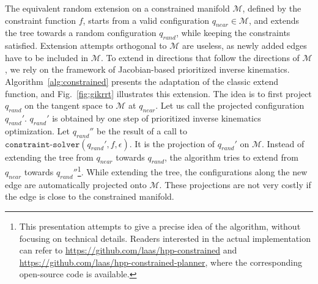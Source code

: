 \documentclass{article}
\newcommand\manifold{\mathcal{M}}
\begin{document}
The equivalent random  extension on a constrained manifold $\manifold$, 
defined by the constraint function $f$,
starts from a valid configuration $q_{near} \in \manifold$, and extends the tree
towards a random configuration $q_{rand}$, while keeping the constraints
satisfied. Extension attempts orthogonal to $\manifold$ are useless,
as newly added edges have to be included  in $\manifold$. To extend in directions
that follow the directions of $\manifold$, we rely on the framework of 
Jacobian-based prioritized inverse kinematics. Algorithm~\ref{alg:constrained} presents
the adaptation of the classic extend function, and Fig.~\ref{fig:gikrrt} illustrates this
extension. The idea is to first project $q_{rand}$ on the tangent
space to $\manifold$  at $q_{near}$. Let us call the projected configuration $q_{rand}'$.
$q_{rand}'$ is obtained by one step of prioritized inverse kinematics optimization. Let 
$q_{rand}''$  be the result of a call to $\texttt{constraint-solver}(q_{rand}',f,\epsilon)$.  It is 
the projection
of $q_{rand}'$ on $\manifold$. Instead of extending the tree from $q_{near}$ towards 
$q_{rand}$, the algorithm tries to extend from $q_{near}$ towards 
$q_{rand}''$\footnote{This presentation attempts to give a precise idea of the algorithm, without 
  focusing on technical details. Readers interested in the actual implementation can
  refer to \url{https://github.com/laas/hpp-constrained} and 
  \url{https://github.com/laas/hpp-constrained-planner}, where the corresponding open-source 
  code is available.}. While extending the tree,
the configurations along the new edge are automatically projected onto $\manifold$. These projections 
are not very costly if the edge is close to the constrained manifold.
\end{document}

